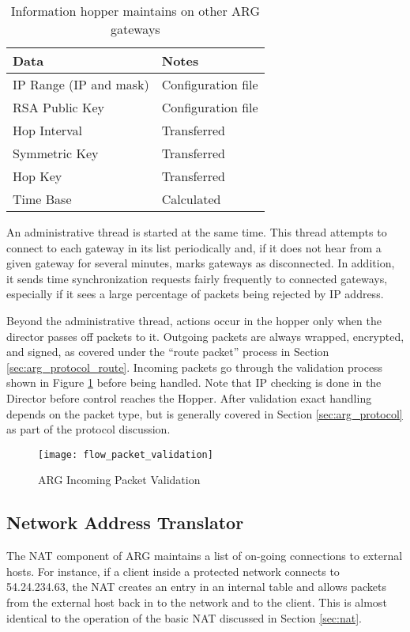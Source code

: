 \begin{table}
\caption{Information hopper maintains on other ARG gateways}
\label{tab:gatestate}
\centering
\begin{tabular}{l|l}
	\textbf{Data} & \textbf{Notes } \\
	\hline
	IP Range (IP and mask) & Configuration file \\
	\ac{RSA} Public Key & Configuration file \\
	Hop Interval & Transferred \\
	Symmetric Key & Transferred \\
	Hop Key & Transferred \\
	Time Base & Calculated \\
\end{tabular}
\end{table}

\par An administrative thread is started at the same time. This thread attempts to connect to each gateway in its list periodically and, if it does not hear from a given gateway for several minutes, marks gateways as disconnected. In addition, it sends time synchronization requests fairly frequently to connected gateways, especially if it sees a large percentage of packets being rejected by \ac{IP} address. 

\par Beyond the administrative thread, actions occur in the hopper only when the director passes off packets to it. Outgoing packets are always wrapped, encrypted, and signed, as covered under the ``route packet'' process in Section \ref{sec:arg_protocol_route}. Incoming packets go through the validation process shown in Figure \ref{fig:arg_hopper_in_validation} before being handled. Note that \ac{IP} checking is done in the Director before control reaches the Hopper. After validation exact handling depends on the packet type, but is generally covered in Section \ref{sec:arg_protocol} as part of the protocol discussion.

\begin{figure}
\caption{\ac{ARG} Incoming Packet Validation}
\label{fig:arg_hopper_in_validation}
\centering
\texttt{[image: flow\_packet\_validation]}
\end{figure}

\subsection{Network Address Translator}
\label{sec:arg_nat}
\par The \ac{NAT} component of \ac{ARG} maintains a list of on-going connections to external hosts. For instance, if a client inside a protected network connects to 54.24.234.63, the \ac{NAT} creates an entry in an internal table and allows packets from the external host back in to the network and to the client. This is almost identical to the operation of the basic \ac{NAT} discussed in Section \ref{sec:nat}.


